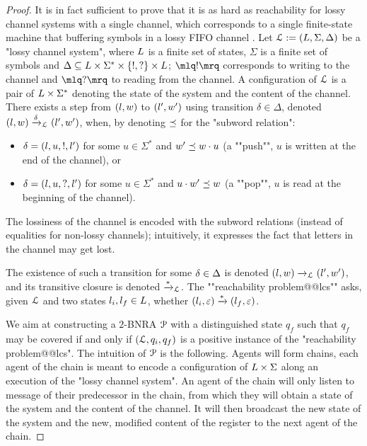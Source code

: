 \ifproofs
\begin{proof}
It is in fact sufficient to prove that it is as hard as reachability for lossy channel systems with a single channel, which corresponds to a single finite-state machine that buffering symbols in a lossy FIFO channel \cite{Schnoebelen2002verifying}.
Let $\mathcal{L} := (L,\Sigma,\Delta)$ be a "lossy channel system", where $L$ is a finite set of states, $\Sigma$ is a finite set of symbols and $\Delta \subseteq L \times \Sigma^* \times \{!, ?\} \times L$; $\quotemarks{!}$ corresponds to writing to the channel and $\quotemarks{?}$ to reading from the channel. A configuration of $\mathcal{L}$ is a pair of $L \times \Sigma^*$ denoting the state of the system and the content of the channel. There exists a step from $(l,w)$ to $(l',w')$ using transition $\delta \in \Delta$, denoted $(l,w) \xrightarrow{\delta}_{\mathcal{L}} (l',w')$, when, by denoting $\preceq$ for the "subword relation":
\begin{itemize}
\item $\delta = (l,u,!,l')$ for some $u \in \Sigma^*$ and $w' \preceq w \cdot u$ (a ""push"", $u$ is written at the end of the channel), or
\item $\delta = (l,u,?,l')$ for some $u \in \Sigma^*$ and $u \cdot w' \preceq w$ (a ""pop"", $u$ is read at the beginning of the channel).
\end{itemize}
The lossiness of the channel is encoded with the subword relations (instead of equalities for non-lossy channels); intuitively, it expresses the fact that letters in the channel may get lost. 

The existence of such a transition for some $\delta \in \Delta$ is denoted $(l,w) \xrightarrow{}_{\mathcal{L}} (l',w')$, and its transitive closure is denoted $\xrightarrow{*}_{\mathcal{L}}$. The ""reachability problem@@lcs"" asks, given $\mathcal{L}$ and two states $l_i, l_f \in L$, whether $(l_i,\varepsilon) \xrightarrow{*} (l_f, \varepsilon)$. 

We aim at constructing a $2$-BNRA $\mathcal{P}$ with a distinguished state $q_f$ such that $q_f$ may be covered if and only if $(\mathcal{L}, q_i, q_f)$ is a positive instance of the "reachability problem@@lcs".
The intuition of $\mathcal{P}$ is the following. Agents will form chains, each agent of the chain is meant to encode a configuration of $L \times \Sigma$ along an execution of the "lossy channel system". 
An agent of the chain will only listen to message of their predecessor in the chain, from which they will obtain a state of the system and the content of the channel. It will then broadcast the new state of the system and the new, modified content of the register to the next agent of the chain. 


\end{proof}

